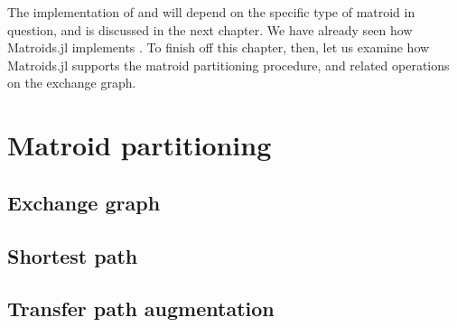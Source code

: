 The implementation of  and  will depend on the specific type of matroid in question, and is discussed in the next chapter. We have already seen how Matroids.jl implements . To finish off this chapter, then, let us examine how Matroids.jl supports the matroid partitioning procedure, and related operations on the exchange graph.

\section{Matroid partitioning}
\label{sec:matroid-union-impl}
\subsection{Exchange graph}
\subsection{Shortest path}
\subsection{Transfer path augmentation}